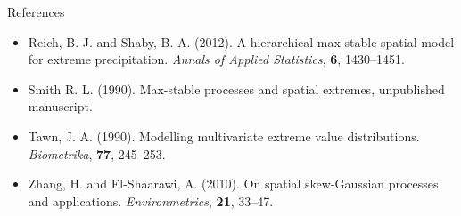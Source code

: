\documentclass{beamer}
\begin{document}
\begin{frame}[allowframebreaks]{References}
\begin{itemize}
    \item Reich, B. J. and Shaby, B. A. (2012). A hierarchical max-stable spatial model for extreme precipitation. {\it Annals of Applied Statistics}, {\bf 6}, 1430--1451.
    \item Smith R. L. (1990). Max-stable processes and spatial extremes, unpublished manuscript.
    \item Tawn, J. A. (1990). Modelling multivariate extreme value distributions. {\it Biometrika}, {\bf 77}, 245--253.
    \item Zhang, H. and El-Shaarawi, A. (2010). On spatial skew-Gaussian processes and applications. {\it Environmetrics}, {\bf 21}, 33--47.
  \end{itemize}
\end{frame}
\end{document}
